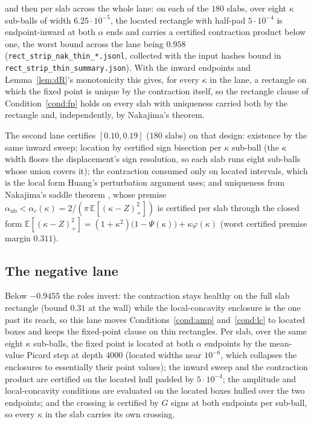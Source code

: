 \documentclass[11pt]{article}
\theoremstyle{remark}
\newcommand{\E}{\mathbb{E}}
\begin{document}
and then per slab across the whole lane: on each of the $180$ slabs,
over eight $\kappa$ sub-balls of width $6.25\cdot10^{-5}$, the
located rectangle with half-pad $5\cdot10^{-4}$ is endpoint-inward at
both $\alpha$ ends and carries a certified contraction product below
one, the worst bound across the lane being $0.958$
(\texttt{rect\_strip\_nak\_thin\_*.jsonl}, collected with the input
hashes bound in \texttt{rect\_strip\_thin\_summary.json}).  With the
inward endpoints and Lemma~\ref{lem:dR}'s monotonicity this gives,
for every $\kappa$ in the lane, a rectangle on which the fixed point
is unique by the contraction itself, so the rectangle clause of
Condition~\ref{cond:fp} holds on every slab with uniqueness carried
both by the rectangle and, independently, by Nakajima's theorem.

The second lane certifies $[0.10,0.19]$ ($180$ slabs) on that
design: existence by the same inward sweep; location by certified
sign bisection per $\kappa$ sub-ball (the $\kappa$ width floors the
displacement's sign resolution, so each slab runs eight sub-balls
whose union covers it); the contraction consumed only on located
intervals, which is the local form Huang's perturbation argument
uses; and uniqueness from Nakajima's saddle theorem
\cite{nakajima2025}, whose premise $\alpha_{\mathrm{ub}}<
\alpha_c(\kappa)=2/(\pi\,\E[(\kappa-Z)_+^2])$ is certified per slab
through the closed form
$\E[(\kappa-Z)_+^2]=(1+\kappa^2)\bigl(1-\Psi(\kappa)\bigr)
+\kappa\varphi(\kappa)$ (worst certified premise margin $0.311$).

\subsection{The negative lane}\label{sec:laneneg}

Below $-0.9455$ the roles invert: the contraction stays healthy on
the full slab rectangle (bound $0.31$ at the wall) while the
local-concavity enclosure is the one past its reach, so this lane
moves Conditions~\ref{cond:amp} and~\ref{cond:lc} to located boxes
and keeps the fixed-point clause on thin rectangles.  Per slab, over
the same eight $\kappa$ sub-balls, the fixed point is located at
both $\alpha$ endpoints by the mean-value Picard step at depth
$4000$ (located widths near $10^{-6}$, which collapses the
enclosures to essentially their point values); the inward sweep and
the contraction product are certified on the located hull padded by
$5\cdot10^{-4}$; the amplitude and local-concavity conditions are
evaluated on the located boxes hulled over the two endpoints; and
the crossing is certified by $G$ signs at both endpoints per
sub-ball, so every $\kappa$ in the slab carries its own crossing.
\end{document}
